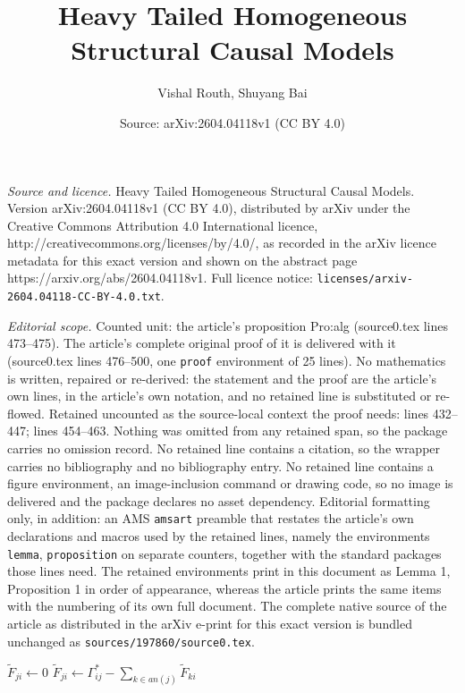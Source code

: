\documentclass[10pt,a4paper]{amsart}
\title{Heavy Tailed Homogeneous Structural Causal Models}
\author{Vishal Routh, Shuyang Bai}
\date{Source: arXiv:2604.04118v1 (CC BY 4.0)}
\begin{document}
\maketitle

\noindent\emph{Source and licence.} Heavy Tailed Homogeneous Structural Causal Models. Version arXiv:2604.04118v1 (CC BY 4.0), distributed by arXiv under the Creative Commons Attribution 4.0 International licence, http://creativecommons.org/licenses/by/4.0/, as recorded in the arXiv licence metadata for this exact version and shown on the abstract page https://arxiv.org/abs/2604.04118v1. Full licence notice: \texttt{licenses/arxiv-2604.04118-CC-BY-4.0.txt}.\par\smallskip

\noindent\textit{Editorial scope.} Counted unit: the article's proposition Pro:alg (source0.tex lines 473--475). The article's complete original proof of it is delivered with it (source0.tex lines 476--500, one \texttt{proof} environment of 25 lines). No mathematics is written, repaired or re-derived: the statement and the proof are the article's own lines, in the article's own notation, and no retained line is substituted or re-flowed.  Retained uncounted as the source-local context the proof needs: lines 432--447; lines 454--463.  Nothing was omitted from any retained span, so the package carries no omission record.  No retained line contains a citation, so the wrapper carries no bibliography and no bibliography entry.  No retained line contains a figure environment, an image-inclusion command or drawing code, so no image is delivered and the package declares no asset dependency.  Editorial formatting only, in addition: an AMS \texttt{amsart} preamble that restates the article's own declarations and macros used by the retained lines, namely the environments \texttt{lemma}, \texttt{proposition} on separate counters, together with the standard packages those lines need.  The retained environments print in this document as Lemma 1, Proposition 1 in order of appearance, whereas the article prints the same items with the numbering of its own full document.  The complete native source of the article as distributed in the arXiv e-print for this exact version is bundled unchanged as \texttt{sources/197860/source0.tex}.
 \begin{algorithm}[h]
 \caption{Find $\widetilde{F}$ from $\boldsymbol{\Gamma}^*$}
\label{alg:findF}
 \begin{algorithmic}[1]
             \State $\widetilde{F}_{ji} \gets 0$
         \EndFor
             \State $\widetilde{F}_{ji} \gets \Gamma^*_{ij} - \sum_{k \in {an}(j)} \widetilde{F}_{ki}$
         \EndFor
     \EndFor
 \EndFor
 \end{algorithmic}
 \end{algorithm}
\end{document}
